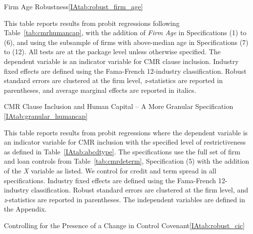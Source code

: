 \documentclass[12pt]{article}
\begin{document}
\begin{appendices}
\begin{singlespace}
\begin{landscapepapertable}{Firm Age Robustness}{\ref{IAtab:robust_firm_age}}{}
  \label{IAtab:robust_firm_age}

  This table reports results from probit regressions following Table~\ref{tab:cmrhumancap}, with the addition of \textit{Firm Age} in Specifications (1) to (6), and using the subsample of firms with above-median age in Specifications (7) to (12).
  All tests are at the package level unless otherwise specified.
  The dependent variable is an indicator variable for CMR clause inclusion.
  Industry fixed effects are defined using the Fama-French 12-industry classification.
  Robust standard errors are clustered at the firm level, \textit{z}-statistics are reported in parentheses, and average marginal effects are reported in italics.
  \postamble

  \startdata
  
\end{landscapepapertable}




\begin{papertable}{CMR Clause Inclusion and Human Capital -- A More Granular Specification} {\ref{IAtab:granular_humancap}}{}
    \label{IAtab:granular_humancap}

    This table reports results from probit regressions where the dependent variable is an indicator variable for CMR inclusion with the specified level of restrictiveness as defined in Table~\ref{IAtab:abcdtype}.
    The specifications use the full set of firm and loan controls from Table~\ref{tab:cmrdeterm}, Specification (5) with the addition of the \textit{X} variable as listed.
    We control for credit and term spread in all specifications.
    Industry fixed effects are defined using the Fama-French 12-industry classification.
    Robust standard errors are clustered at the firm level, and \textit{z}-statistics are reported in parentheses.
    The independent variables are defined in the Appendix.
    \postamblesig

    \startdata
    
\end{papertable}




\begin{papertable}{Controlling for the Presence of a Change in Control Covenant}{\ref{IAtab:robust_cic}}{}
  \label{IAtab:robust_cic}


\end{papertable}
\end{singlespace}
\end{appendices}
\end{document}
